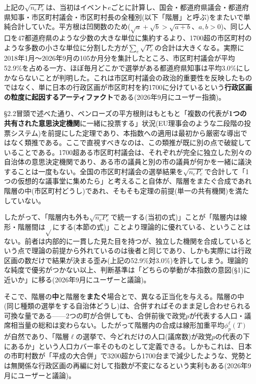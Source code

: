 \documentclass[a4paper,11pt]{ltjsarticle}
\begin{document}
上記の$\sqrt{n_eP_e}$は、当初はイベント$e$ごとに計算し、国会・都道府県議会・都道府県知事・市区町村議会・市区町村長の全種別(以下「階層」と呼ぶ)をまたいで単純合計していた。平方根は凹関数のため($\sqrt{a}+\sqrt{b} > \sqrt{a+b}$、$a,b>0$)、同じ人口を47都道府県のような少数の大きな単位に集約するより、1700超の市区町村のような多数の小さな単位に分割した方が$\sum_e\sqrt{P_e}$の合計は大きくなる。実際に2018年1月〜2026年9月の105か月分を集計したところ、市区町村議会が平均52.9\%を占める一方、ほぼ毎月どこかで選挙がある都道府県知事は平均3.0\%にしかならないことが判明した。これは市区町村議会の政治的重要性を反映したものではなく、単に日本の行政区画が市区町村を約1700に分けているという\textbf{行政区画の粒度に起因するアーティファクト}である(2026年9月にユーザー指摘)。

\S2.2冒頭で述べた通り、ペンローズの平方根則はもともと「複数の代表が\textbf{1つの共有された意思決定機関}に一緒に投票する」状況(EU理事会のような二段階の投票システム)を前提にした定理であり、本指数への適用は最初から厳密な導出ではなく類推である。ここで直視すべきなのは、この類推が既に別の点で破綻していることである。1700超ある市区町村議会は、それぞれが完全に独立した別々の自治体の意思決定機関であり、ある市の議員と別の市の議員が何かを一緒に議決することは一度もない。全国の市区町村議会の選挙結果を$\sqrt{n_eP_e}$で合計して「1つの仮想的な議事堂に集めたら」と考えること自体が、階層をまたぐ合成であれ階層の中(市区町村どうし)であれ、そもそも定理の前提(単一の共有機関)を満たしていない。

したがって、「階層内も外も$\sqrt{n_eP_e}$で統一する(当初の式)」ことが「階層内は線形・階層間は$\sqrt{}$にする(本節の式)」ことより理論的に優れている、ということはない。前者は内部的に一貫した見た目を持つが、独立した機関を合成しているという点で理論の前提から外れているのは後者と同じであり、しかも実際には行政区画の数だけで結果が決まる歪み(上記の52.9\%対3.0\%)を許してしまう。理論的な純度で優劣がつかない以上、判断基準は「どちらの挙動が本指数の意図(\S1)に近いか」に移る(2026年9月にユーザーと議論)。

そこで、階層の\textbf{中}と階層を\textbf{またぐ}場合とで、異なる正当化を与える。階層の中(同じ種類の選挙をする自治体どうし)は、合併すればそのまま足し合わせられる可換な量である——2つの町が合併しても、合併前後で政党$p$が代表する人口・議席相当量の総和は変わらない。したがって階層内の合成は線形加重平均$\phi_p^\ell(T)$が自然であり、「階層$\ell$の選挙で、今どれだけの人口(議席数)が政党$p$の代表の下にあるか」という人口カバー率そのものとして定義できる。しかもこれは、日本の市町村数が「平成の大合併」で3200超から1700台まで減少したような、党勢とは無関係な行政区画の再編に対して指数が不変になるという実利もある(2026年9月にユーザーと議論)。
\end{document}
